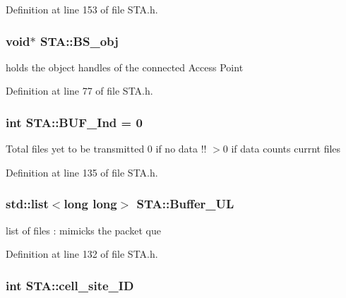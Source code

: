 Definition at line 153 of file S\-T\-A.\-h.

\hypertarget{classSTA_abfa329ed1a4539a0f88ef568f41aaac9}{
\subsubsection[{B\-S\-\_\-obj}]{\setlength{\rightskip}{0pt plus 5cm}void$\ast$ S\-T\-A\-::\-B\-S\-\_\-obj\hspace{0.3cm}{\ttfamily [private]}}}\label{classSTA_abfa329ed1a4539a0f88ef568f41aaac9}


holds the object handles of the connected Access Point 



Definition at line 77 of file S\-T\-A.\-h.

\hypertarget{classSTA_a1ca62aa52da9e93aacdf3aa8886966c2}{
\subsubsection[{B\-U\-F\-\_\-\-Ind}]{\setlength{\rightskip}{0pt plus 5cm}int S\-T\-A\-::\-B\-U\-F\-\_\-\-Ind = 0}}\label{classSTA_a1ca62aa52da9e93aacdf3aa8886966c2}
Total files yet to be transmitted 0 if no data !! $>$0 if data counts currnt files 

Definition at line 135 of file S\-T\-A.\-h.

\hypertarget{classSTA_a8c7ef37eea259e8a2c662d0d4a0a73ff}{
\subsubsection[{Buffer\-\_\-\-U\-L}]{\setlength{\rightskip}{0pt plus 5cm}std\-::list$<$long long$>$ S\-T\-A\-::\-Buffer\-\_\-\-U\-L}}\label{classSTA_a8c7ef37eea259e8a2c662d0d4a0a73ff}


list of files \-: mimicks the packet que 



Definition at line 132 of file S\-T\-A.\-h.

\hypertarget{classSTA_a434bab00c391cd259abd7582cace24a1}{
\subsubsection[{cell\-\_\-site\-\_\-\-I\-D}]{\setlength{\rightskip}{0pt plus 5cm}int S\-T\-A\-::cell\-\_\-site\-\_\-\-I\-D}}\label{classSTA_a434bab00c391cd259abd7582cace24a1}


